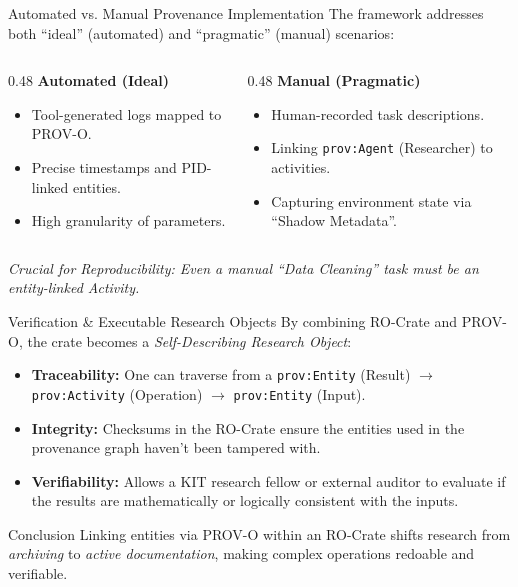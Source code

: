 \documentclass[aspectratio=169]{beamer}
\begin{document}
\begin{frame}{Automated vs. Manual Provenance Implementation}
    The framework addresses both \enquote{ideal} (automated) and \enquote{pragmatic} (manual) scenarios:
    \vfill
    \begin{columns}[T]
        \begin{column}{0.48\textwidth}
            \textbf{Automated (Ideal)}
            \begin{itemize}
                \item Tool-generated logs mapped to PROV-O.
                \item Precise timestamps and PID-linked entities.
                \item High granularity of parameters.
            \end{itemize}
        \end{column}
        \begin{column}{0.48\textwidth}
            \textbf{Manual (Pragmatic)}
            \begin{itemize}
                \item Human-recorded task descriptions.
                \item Linking \texttt{prov:Agent} (Researcher) to activities.
                \item Capturing environment state via \enquote{Shadow Metadata}.
            \end{itemize}
        \end{column}
    \end{columns}
    \vfill
    \begin{center}
        \textit{Crucial for Reproducibility: Even a manual \enquote{Data Cleaning} task must be an entity-linked Activity.}
    \end{center}
\end{frame}

\begin{frame}{Verification \& Executable Research Objects}
    By combining RO-Crate and PROV-O, the crate becomes a \textit{Self-Describing Research Object}:
    \begin{itemize}
        \item \textbf{Traceability:} One can traverse from a \texttt{prov:Entity} (Result) $\rightarrow$ \texttt{prov:Activity} (Operation) $\rightarrow$ \texttt{prov:Entity} (Input).
        \item \textbf{Integrity:} Checksums in the RO-Crate ensure the entities used in the provenance graph haven't been tampered with.
        \item \textbf{Verifiability:} Allows a KIT research fellow or external auditor to evaluate if the results are mathematically or logically consistent with the inputs.
    \end{itemize}
    \begin{exampleblock}{Conclusion}
        Linking entities via PROV-O within an RO-Crate shifts research from \textit{archiving} to \textit{active documentation}, making complex operations redoable and verifiable.
    \end{exampleblock}
\end{frame}
\end{document}
